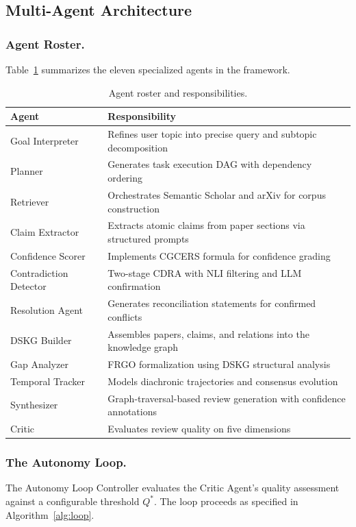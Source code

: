 \subsection{Multi-Agent Architecture}

\subsubsection{Agent Roster.}
Table~\ref{tab:agents} summarizes the eleven specialized agents in the framework.

\begin{table}[ht]
\caption{Agent roster and responsibilities.}\label{tab:agents}
\centering
\small
\begin{tabular}{p{3.2cm}p{8cm}}
\toprule
\textbf{Agent} & \textbf{Responsibility} \\
\midrule
Goal Interpreter & Refines user topic into precise query and subtopic decomposition \\
Planner & Generates task execution DAG with dependency ordering \\
Retriever & Orchestrates Semantic Scholar and arXiv for corpus construction \\
Claim Extractor & Extracts atomic claims from paper sections via structured prompts \\
Confidence Scorer & Implements CGCERS formula for confidence grading \\
Contradiction Detector & Two-stage CDRA with NLI filtering and LLM confirmation \\
Resolution Agent & Generates reconciliation statements for confirmed conflicts \\
DSKG Builder & Assembles papers, claims, and relations into the knowledge graph \\
Gap Analyzer & FRGO formalization using DSKG structural analysis \\
Temporal Tracker & Models diachronic trajectories and consensus evolution \\
Synthesizer & Graph-traversal-based review generation with confidence annotations \\
Critic & Evaluates review quality on five dimensions \\
\bottomrule
\end{tabular}
\end{table}

\subsubsection{The Autonomy Loop.}
The Autonomy Loop Controller evaluates the Critic Agent's quality assessment against a configurable threshold $Q^*$. The loop proceeds as specified in Algorithm~\ref{alg:loop}.

